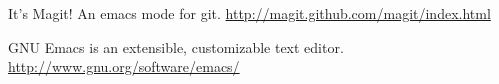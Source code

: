 \cleardoublepage
{}
{}
\begin{thebibliography}{99}

 It's Magit! An emacs mode for git.
  \url{ http://magit.github.com/magit/index.html}

 GNU Emacs is an extensible, customizable text editor.
  \url{http://www.gnu.org/software/emacs/}

\end{thebibliography}
